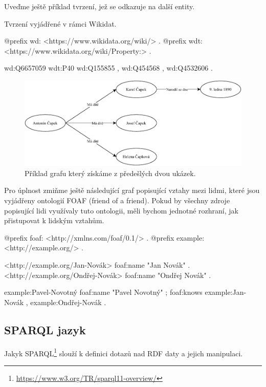 Uveďme ještě příklad tvrzení, jež se odkazuje na další entity.
\begin{prikl}
Tvrzení  vyjádřené v rámci Wikidat.
\begin{code}
@prefix wd: <https://www.wikidata.org/wiki/> .
@prefix wdt: <https://www.wikidata.org/wiki/Property:> .

wd:Q6657059 wdt:P40 wd:Q155855 ,
                    wd:Q454568 ,
                    wd:Q4532606 .
\end{code}
\end{prikl}

\begin{figure}[h]
    \centering
    \includegraphics[width=\textwidth]{media/rdf.pdf}
    \caption{Příklad grafu který získáme z předešlých dvou ukázek.}
\end{figure}

Pro úplnost zmiňme ještě následující graf popisující vztahy mezi lidmi, které jsou vyjádřeny ontologií FOAF (friend of a friend). Pokud by všechny zdroje popisující lidi využívaly tuto ontologii, měli bychom jednotné rozhraní, jak přistupovat k lidským vztahům.

\begin{code}
@prefix foaf: <http://xmlns.com/foaf/0.1/> .
@prefix example: <http://example.org/> .

<http://example.org/Jan-Novák> foaf:name "Jan Novák" .
<http://example.org/Ondřej-Novák> foaf:name "Ondřej Novák" .

example:Pavel-Novotný foaf:name "Pavel Novotný" ;
                      foaf:knows example:Jan-Novák ,
                                 example:Ondřej-Novák .
\end{code}

\subsection{SPARQL jazyk}
Jakyk SPARQL\footnote{\url{https://www.w3.org/TR/sparql11-overview/}} slouží k definici dotazů nad RDF daty a jejich manipulaci.

